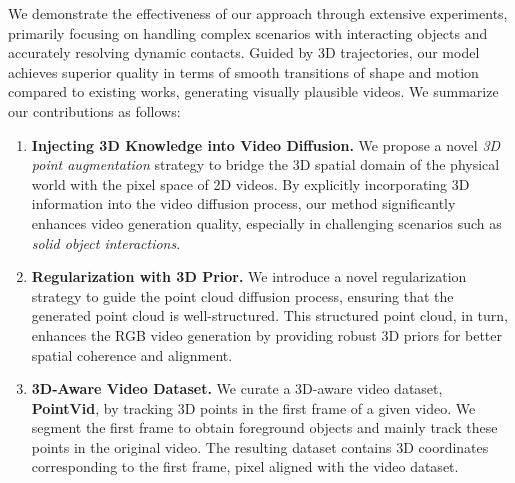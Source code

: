 We demonstrate the effectiveness of our approach through extensive experiments, primarily focusing on handling complex scenarios with interacting objects and accurately resolving dynamic contacts. Guided by 3D trajectories, our model achieves superior quality in terms of smooth transitions of shape and motion compared to existing works, generating visually plausible videos. We summarize our contributions as follows:

\begin{enumerate} [nosep]

    
    \item \textbf{Injecting 3D Knowledge into Video Diffusion.} We propose a novel \emph{3D point augmentation} strategy to bridge the 3D spatial domain of the physical world with the pixel space of 2D videos. By explicitly incorporating 3D information into the video diffusion process, our method significantly enhances video generation quality, especially in challenging scenarios such as \emph{solid object interactions}.

  \item \textbf{Regularization with 3D Prior.} We introduce a novel regularization strategy to guide the point cloud diffusion process, ensuring that the generated point cloud is well-structured. This structured point cloud, in turn, enhances the RGB video generation by providing robust 3D priors for better spatial coherence and alignment.
    
    \item \textbf{3D-Aware Video Dataset.} We curate a 3D-aware video dataset, \textbf{PointVid}, by tracking 3D points in the first frame of a given video. We segment the first frame to obtain foreground objects and mainly track these points in the original video. The resulting dataset contains 3D coordinates corresponding to the first frame, pixel aligned with the video dataset.
  
    
\end{enumerate}
